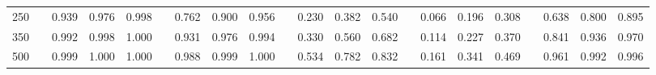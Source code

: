 % 
\begin{tabular}{ccccccccccccccccccccc}
  \hline
  \hline
250 &  & 0.939 & 0.976 & 0.998 &  & 0.762 & 0.900 & 0.956 &  & 0.230 & 0.382 & 0.540 &  & 0.066 & 0.196 & 0.308 &  & 0.638 & 0.800 & 0.895 \\ 
  350 &  & 0.992 & 0.998 & 1.000 &  & 0.931 & 0.976 & 0.994 &  & 0.330 & 0.560 & 0.682 &  & 0.114 & 0.227 & 0.370 &  & 0.841 & 0.936 & 0.970 \\ 
  500 &  & 0.999 & 1.000 & 1.000 &  & 0.988 & 0.999 & 1.000 &  & 0.534 & 0.782 & 0.832 &  & 0.161 & 0.341 & 0.469 &  & 0.961 & 0.992 & 0.996 \\ 
   \hline
\end{tabular}
